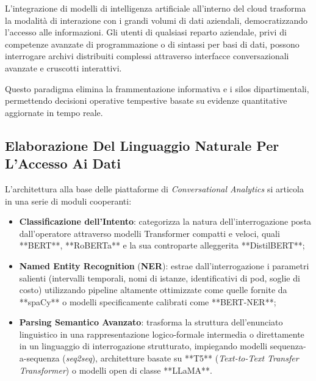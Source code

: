 \documentclass[11pt, a4paper]{article}
\begin{document}
L'integrazione di modelli di intelligenza artificiale all'interno del cloud trasforma la modalità di interazione con i grandi volumi di dati aziendali, democratizzando l'accesso alle informazioni. Gli utenti di qualsiasi reparto aziendale, privi di competenze avanzate di programmazione o di sintassi per basi di dati, possono interrogare archivi distribuiti complessi attraverso interfacce conversazionali avanzate e cruscotti interattivi.


Questo paradigma elimina la frammentazione informativa e i silos dipartimentali, permettendo decisioni operative tempestive basate su evidenze quantitative aggiornate in tempo reale.


\subsection{Elaborazione Del Linguaggio Naturale Per L'Accesso Ai Dati}

L'architettura alla base delle piattaforme di \emph{Conversational Analytics} si articola in una serie di moduli cooperanti:
\begin{itemize}
    \item \textbf{Classificazione dell'Intento}: categorizza la natura dell'interrogazione posta dall'operatore attraverso modelli Transformer compatti e veloci, quali **BERT**, **RoBERTa** e la sua controparte alleggerita **DistilBERT**;
    \item \textbf{Named Entity Recognition} (\textbf{NER}): estrae dall'interrogazione i parametri salienti (intervalli temporali, nomi di istanze, identificativi di pod, soglie di costo) utilizzando pipeline altamente ottimizzate come quelle fornite da **spaCy** o modelli specificamente calibrati come **BERT-NER**;
    \item \textbf{Parsing Semantico Avanzato}: trasforma la struttura dell'enunciato linguistico in una rappresentazione logico-formale intermedia o direttamente in un linguaggio di interrogazione strutturato, impiegando modelli sequenza-a-sequenza (\emph{seq2seq}), architetture basate su **T5** (\emph{Text-to-Text Transfer Transformer}) o modelli open di classe **LLaMA**.
\end{itemize}
\end{document}
